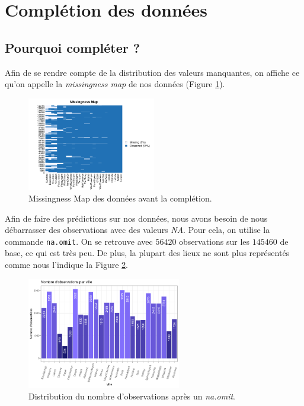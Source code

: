 \documentclass{article}
\begin{document}
\section{Complétion des données}

\subsection{Pourquoi compléter ?}

Afin de se rendre compte de la distribution des valeurs manquantes, on affiche ce qu'on appelle la \emph{missingness map} de nos données (Figure \ref{fig:missingness_raw}).

\begin{figure}[htp]
    \centering
    \includegraphics[width=0.5\textwidth]{Images/missmap.png}
    \caption{Missingness Map des données avant la complétion.}
    \label{fig:missingness_raw}
\end{figure}

Afin de faire des prédictions sur nos données, nous avons besoin de nous débarrasser des observations avec des valeurs \emph{NA}. Pour cela, on utilise la commande \texttt{na.omit}. On se retrouve avec $56420$ observations sur les $145460$ de base, ce qui est très peu. De plus, la plupart des lieux ne sont plus représentés comme nous l'indique la Figure \ref{fig:distrib_raw}.

\begin{figure}[htp]
    \centering
    \includegraphics[width=0.6\textwidth]{Images/distribution_lieux_raw.png}
    \caption{Distribution du nombre d'observations après un \emph{na.omit}.}
    \label{fig:distrib_raw}
\end{figure}
\end{document}
